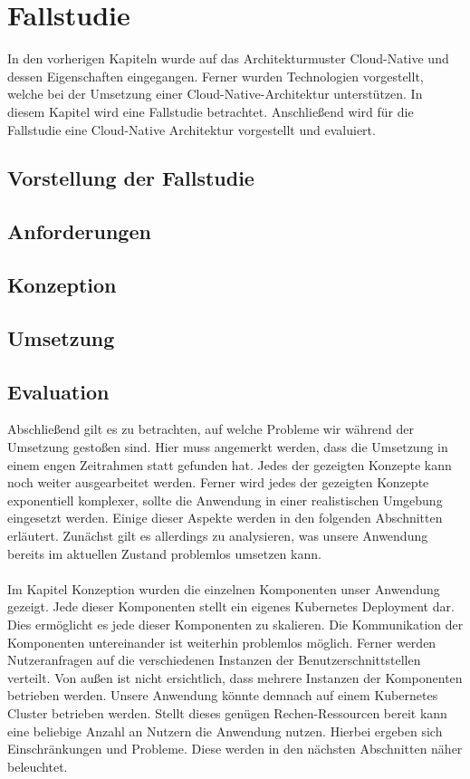 \chapter{Fallstudie}
\label{ch:fallstudie}
In den vorherigen Kapiteln wurde auf das Architekturmuster Cloud-Native und dessen Eigenschaften eingegangen. Ferner wurden Technologien vorgestellt, welche bei der Umsetzung einer Cloud-Native-Architektur unterstützen. In diesem Kapitel wird eine Fallstudie betrachtet. Anschließend wird für die Fallstudie eine Cloud-Native Architektur vorgestellt und evaluiert.

\section{Vorstellung der Fallstudie}
\section{Anforderungen}
\section{Konzeption}
\section{Umsetzung}
\section{Evaluation}
Abschließend gilt es zu betrachten, auf welche Probleme wir während der Umsetzung gestoßen sind. Hier muss angemerkt werden, dass die Umsetzung in einem engen Zeitrahmen statt gefunden hat. Jedes der gezeigten Konzepte kann noch weiter ausgearbeitet werden. Ferner wird jedes der gezeigten Konzepte exponentiell komplexer, sollte die Anwendung in einer realistischen Umgebung eingesetzt werden. Einige dieser Aspekte werden in den folgenden Abschnitten erläutert. Zunächst gilt es allerdings zu analysieren, was unsere Anwendung bereits im aktuellen Zustand problemlos umsetzen kann.\\
\\
Im Kapitel Konzeption wurden die einzelnen Komponenten unser Anwendung gezeigt. Jede dieser Komponenten stellt ein eigenes Kubernetes Deployment dar. Dies ermöglicht es jede dieser Komponenten zu skalieren. Die Kommunikation der Komponenten untereinander ist weiterhin problemlos möglich. Ferner werden Nutzeranfragen auf die verschiedenen Instanzen der Benutzerschnittstellen verteilt. Von außen ist nicht ersichtlich, dass mehrere Instanzen der Komponenten betrieben werden. Unsere Anwendung könnte demnach auf einem Kubernetes Cluster betrieben werden. Stellt dieses genügen Rechen-Ressourcen bereit kann eine beliebige Anzahl an Nutzern die Anwendung nutzen. Hierbei ergeben sich Einschränkungen und Probleme. Diese werden in den nächsten Abschnitten näher beleuchtet.
